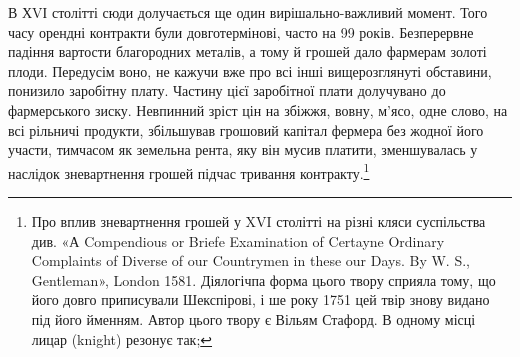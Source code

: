 В ХVІ столітті сюди долучається ще один вирішально-важливий
момент. Того часу орендні контракти були довготермінові,
часто на 99 років. Безперервне падіння вартости благородних
металів, а тому й грошей дало фармерам золоті плоди. Передусім
воно, не кажучи вже про всі інші вищерозглянуті обставини,
понизило заробітну плату. Частину цієї заробітної плати долучувано
до фармерського зиску. Невпинний зріст цін на збіжжя,
вовну, м’ясо, одне слово, на всі рільничі продукти, збільшував
грошовий капітал фермера без жодної його участи, тимчасом
як земельна рента, яку він мусив платити, зменшувалась у наслідок
зневартнення грошей підчас тривання контракту.\footnote{
Про вплив зневартнення грошей у XVI столітті на різні кляси
суспільства див. «А Compendious or Briefe Examination of Certayne Ordinary
Complaints of Diverse of our Countrymen in these our Days. By
W. S., Gentleman», London 1581. Діялогічпа форма цього твору сприяла
тому, що його довго приписували Шекспірові, і ше року 1751 цей твір
знову видано під його йменням. Автор цього твору є Вільям Стафорд.
В одному місці лицар (knight) резонує так;

}
